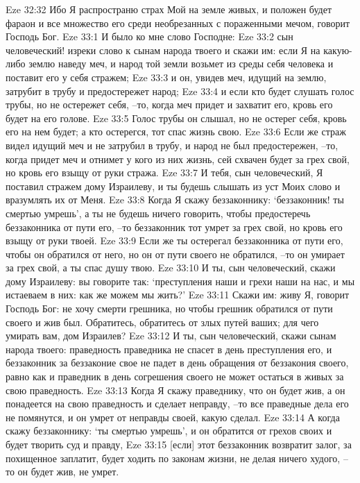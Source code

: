 Eze 32:32  Ибо Я распространю страх Мой на земле живых, и положен будет фараон и все множество его среди необрезанных с пораженными мечом, говорит Господь Бог.
Eze 33:1  И было ко мне слово Господне:
Eze 33:2  сын человеческий! изреки слово к сынам народа твоего и скажи им: если Я на какую-либо землю наведу меч, и народ той земли возьмет из среды себя человека и поставит его у себя стражем;
Eze 33:3  и он, увидев меч, идущий на землю, затрубит в трубу и предостережет народ;
Eze 33:4  и если кто будет слушать голос трубы, но не остережет себя, --то, когда меч придет и захватит его, кровь его будет на его голове.
Eze 33:5  Голос трубы он слышал, но не остерег себя, кровь его на нем будет; а кто остерегся, тот спас жизнь свою.
Eze 33:6  Если же страж видел идущий меч и не затрубил в трубу, и народ не был предостережен, --то, когда придет меч и отнимет у кого из них жизнь, сей схвачен будет за грех свой, но кровь его взыщу от руки стража.
Eze 33:7  И тебя, сын человеческий, Я поставил стражем дому Израилеву, и ты будешь слышать из уст Моих слово и вразумлять их от Меня.
Eze 33:8  Когда Я скажу беззаконнику: `беззаконник! ты смертью умрешь', а ты не будешь ничего говорить, чтобы предостеречь беззаконника от пути его, --то беззаконник тот умрет за грех свой, но кровь его взыщу от руки твоей.
Eze 33:9  Если же ты остерегал беззаконника от пути его, чтобы он обратился от него, но он от пути своего не обратился, --то он умирает за грех свой, а ты спас душу твою.
Eze 33:10  И ты, сын человеческий, скажи дому Израилеву: вы говорите так: `преступления наши и грехи наши на нас, и мы истаеваем в них: как же можем мы жить?'
Eze 33:11  Скажи им: живу Я, говорит Господь Бог: не хочу смерти грешника, но чтобы грешник обратился от пути своего и жив был. Обратитесь, обратитесь от злых путей ваших; для чего умирать вам, дом Израилев?
Eze 33:12  И ты, сын человеческий, скажи сынам народа твоего: праведность праведника не спасет в день преступления его, и беззаконник за беззаконие свое не падет в день обращения от беззакония своего, равно как и праведник в день согрешения своего не может остаться в живых за свою праведность.
Eze 33:13  Когда Я скажу праведнику, что он будет жив, а он понадеется на свою праведность и сделает неправду, --то все праведные дела его не помянутся, и он умрет от неправды своей, какую сделал.
Eze 33:14  А когда скажу беззаконнику: `ты смертью умрешь', и он обратится от грехов своих и будет творить суд и правду,
Eze 33:15  [если] этот беззаконник возвратит залог, за похищенное заплатит, будет ходить по законам жизни, не делая ничего худого, --то он будет жив, не умрет.
